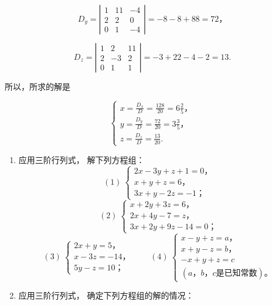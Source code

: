 \[
D _ {y} = \left| \begin{array}{ccc} 1 & 11 & - 4 \\ 2 & 2 & 0 \\ 0 & 1 & - 4 \end{array} \right| = - 8 - 8 + 88 = 72\text{，}
\]

\[
D _ {z} = \left| \begin{array}{ccc} 1 & 2 & 11 \\ 2 & - 3 & 2 \\ 0 & 1 & 1 \end{array} \right| = - 3 + 22 - 4 - 2 = 13.
\]

所以，所求的解是

\[
\left\{ \begin{array}{l} x = \frac {D _ {x}}{D} = \frac {128}{20} = 6 \frac {2}{5}\text{，} \\ y = \frac {D _ {y}}{D} = \frac {72}{20} = 3 \frac {3}{5}\text{，} \\ z = \frac {D _ {z}}{D} = \frac {13}{20}. \end{array} \right.
\]

\begin{enumerate}
\item
  应用三阶行列式， 解下列方程组：
\[
(1)\ \left\{ \begin{array}{l} 2 x - 3 y + z + 1 = 0\text{，} \\ x + y + z = 6\text{，} \\ 3 x + y - 2 z = - 1\text{；} \end{array} \right.
\]
\[
(2)\ \left\{ \begin{array}{l} x + 2 y + 3 z = 6\text{，} \\ 2 x + 4 y - 7 = z\text{，} \\ 3 x + 2 y + 9 z - 14 = 0\text{；} \end{array} \right.
\]
\[
(3)\ \left\{ \begin{array}{l} 2 x + y = 5\text{，} \\ x - 3 z = - 14\text{，} \\ 5 y - z = 10\text{；} \end{array} \right.
\qquad
(4)\ \left\{ \begin{array}{l} x - y + z = a\text{，} \\ x + y - z = b\text{，} \\ - x + y + z = c \\ (a\text{，} b\text{，} c \text{是已知常数})\text{。} \end{array} \right.
\]
\item
  应用三阶行列式， 确定下列方程组的解的情况：
\end{enumerate}

